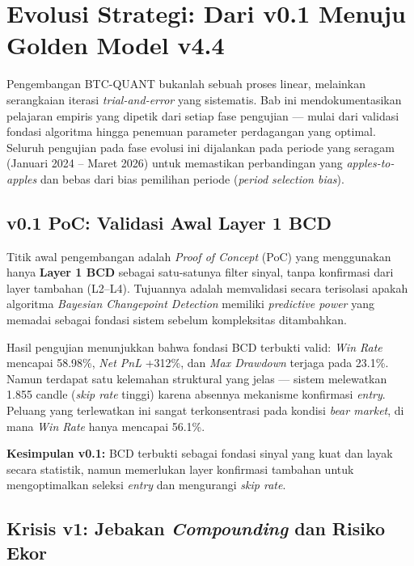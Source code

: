 \section{Evolusi Strategi: Dari v0.1 Menuju Golden Model v4.4}
\label{sec:evolution}

Pengembangan BTC-QUANT bukanlah sebuah proses linear, melainkan serangkaian iterasi \textit{trial-and-error} yang sistematis. Bab ini mendokumentasikan pelajaran empiris yang dipetik dari setiap fase pengujian --- mulai dari validasi fondasi algoritma hingga penemuan parameter perdagangan yang optimal. Seluruh pengujian pada fase evolusi ini dijalankan pada periode yang seragam (Januari 2024 -- Maret 2026) untuk memastikan perbandingan yang \textit{apples-to-apples} dan bebas dari bias pemilihan periode (\textit{period selection bias}).

\subsection{v0.1 PoC: Validasi Awal Layer 1 BCD}

Titik awal pengembangan adalah \textit{Proof of Concept} (PoC) yang menggunakan hanya \textbf{Layer 1 BCD} sebagai satu-satunya filter sinyal, tanpa konfirmasi dari layer tambahan (L2--L4). Tujuannya adalah memvalidasi secara terisolasi apakah algoritma \textit{Bayesian Changepoint Detection} memiliki \textit{predictive power} yang memadai sebagai fondasi sistem sebelum kompleksitas ditambahkan.

Hasil pengujian menunjukkan bahwa fondasi BCD terbukti valid: \textit{Win Rate} mencapai 58.98\%, \textit{Net PnL} +312\%, dan \textit{Max Drawdown} terjaga pada 23.1\%. Namun terdapat satu kelemahan struktural yang jelas --- sistem melewatkan 1.855 candle (\textit{skip rate} tinggi) karena absennya mekanisme konfirmasi \textit{entry}. Peluang yang terlewatkan ini sangat terkonsentrasi pada kondisi \textit{bear market}, di mana \textit{Win Rate} hanya mencapai 56.1\%.

\textbf{Kesimpulan v0.1:} BCD terbukti sebagai fondasi sinyal yang kuat dan layak secara statistik, namun memerlukan layer konfirmasi tambahan untuk mengoptimalkan seleksi \textit{entry} dan mengurangi \textit{skip rate}.

\subsection{Krisis v1: Jebakan \textit{Compounding} dan Risiko Ekor}

